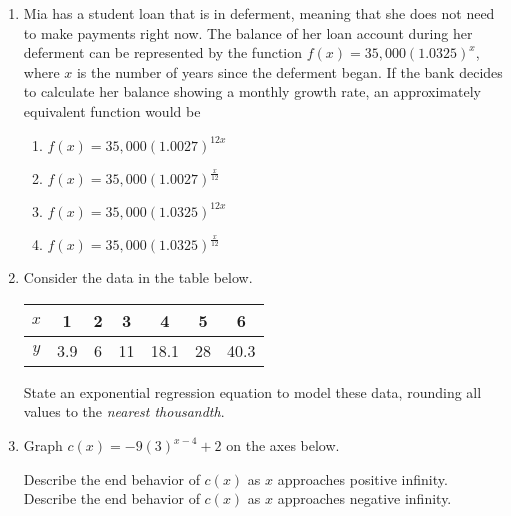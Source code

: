 \documentclass[12pt, twoside]{article}
\begin{document}
\begin{enumerate}[itemsep=0.5cm]
\item  %
Mia has a student loan that is in deferment, meaning that she does
not need to make payments right now. The balance of her loan
account during her deferment can be represented by the function
$f(x) = 35,000 (1.0325)^x$, where $x$ is the number of years since the
deferment began. If the bank decides to calculate her balance showing
a monthly growth rate, an approximately equivalent function would be
\begin{enumerate}
    \item $f(x) = 35,000 (1.0027)^{12x}$
    \item $\displaystyle f(x) = 35,000 (1.0027)^{\frac{x}{12}}$
    \item $f(x) = 35,000 (1.0325)^{12x}$
    \item $\displaystyle f(x) = 35,000 (1.0325)^{\frac{x}{12}}$
\end{enumerate}

\item Consider the data in the table below. %
\begin{center}
\begin{tabular}{|c|c|c|c|c|c|c|}
    \hline
$x$ & 1 & 2 & 3 & 4 & 5 & 6 \\
\hline
$y$ & 3.9 & 6 & 11 & 18.1 & 28 & 40.3 \\
\hline
\end{tabular}
\end{center}
State an exponential regression equation to model these data, rounding all values to the \emph{nearest thousandth}.

\newpage
\item Graph $c(x) = -9(3)^{x-4} + 2$ on the axes below. %
    \begin{center}
    \end{center}
    Describe the end behavior of $c(x)$ as $x$ approaches positive infinity. \\[2cm]
    Describe the end behavior of $c(x)$ as $x$ approaches negative infinity.


\end{enumerate}
\end{document}
